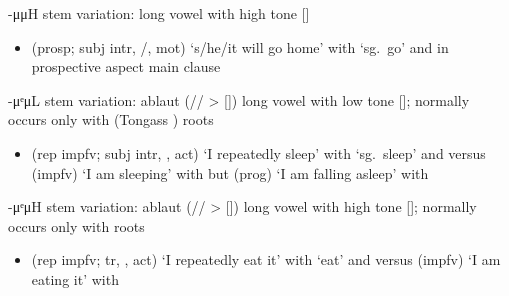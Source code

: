 \begin{morphdesc}[resume*=alphalist]
\item[-μμH]\label{m:-μμH}
	stem variation: long vowel with high tone []
	\begin{itemize}
	\item	{} (prosp; subj intr, /, mot) ‘s/he/it will go home’
		with  ‘sg.\ go’ and 
		in prospective aspect main clause
	\end{itemize}

\item[-μᵉμL]\label{m:-μᵉμL}
	stem variation: ablaut (// > []) long vowel with low tone [];
	normally occurs only with  (Tongass ) roots
	\begin{itemize}
	\item	{} (rep impfv; subj intr, ,  act) ‘I repeatedly sleep’
			with  ‘sg.\ sleep’ and \newline
		versus
		 (impfv) ‘I am sleeping’
			with \newline
		but  (prog) ‘I am falling asleep’
			with 
	\end{itemize}

\item[-μᵉμH]\label{m:-μᵉμH}
	stem variation: ablaut (// > []) long vowel with high tone [];
	normally occurs only with  roots
	\begin{itemize}
	\item	{} (rep impfv; tr, ,  act) ‘I repeatedly eat it’
			with  ‘eat’ and \newline
		versus
		 (impfv) ‘I am eating it’
			with 
	\end{itemize}


\end{morphdesc}
